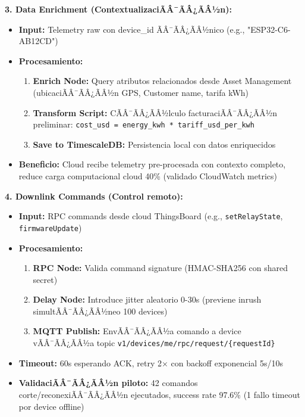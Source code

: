 \textbf{3. Data Enrichment (ContextualizaciÃÂ¯ÃÂ¿ÃÂ½n):}

\begin{itemize}
    \item \textbf{Input:} Telemetry raw con device\_id ÃÂ¯ÃÂ¿ÃÂ½nico (e.g., "ESP32-C6-AB12CD")
    \item \textbf{Procesamiento:}
    \begin{enumerate}
        \item \textbf{Enrich Node:} Query atributos relacionados desde Asset Management (ubicaciÃÂ¯ÃÂ¿ÃÂ½n GPS, Customer name, tarifa kWh)
        \item \textbf{Transform Script:} CÃÂ¯ÃÂ¿ÃÂ½lculo facturaciÃÂ¯ÃÂ¿ÃÂ½n preliminar: \texttt{cost\_usd = energy\_kwh * tariff\_usd\_per\_kwh}
        \item \textbf{Save to TimescaleDB:} Persistencia local con datos enriquecidos
    \end{enumerate}
    \item \textbf{Beneficio:} Cloud recibe telemetry pre-procesada con contexto completo, reduce carga computacional cloud 40\% (validado CloudWatch metrics)
\end{itemize}

\textbf{4. Downlink Commands (Control remoto):}

\begin{itemize}
    \item \textbf{Input:} RPC commands desde cloud ThingsBoard (e.g., \texttt{setRelayState}, \texttt{firmwareUpdate})
    \item \textbf{Procesamiento:}
    \begin{enumerate}
        \item \textbf{RPC Node:} Valida command signature (HMAC-SHA256 con shared secret)
        \item \textbf{Delay Node:} Introduce jitter aleatorio 0-30s (previene inrush simultÃÂ¯ÃÂ¿ÃÂ½neo 100 devices)
        \item \textbf{MQTT Publish:} EnvÃÂ¯ÃÂ¿ÃÂ½a comando a device vÃÂ¯ÃÂ¿ÃÂ½a topic \texttt{v1/devices/me/rpc/request/\{requestId\}}
    \end{enumerate}
    \item \textbf{Timeout:} 60s esperando ACK, retry 2$\times$ con backoff exponencial 5s/10s
    \item \textbf{ValidaciÃÂ¯ÃÂ¿ÃÂ½n piloto:} 42 comandos corte/reconexiÃÂ¯ÃÂ¿ÃÂ½n ejecutados, success rate 97.6\% (1 fallo timeout por device offline)
\end{itemize}

